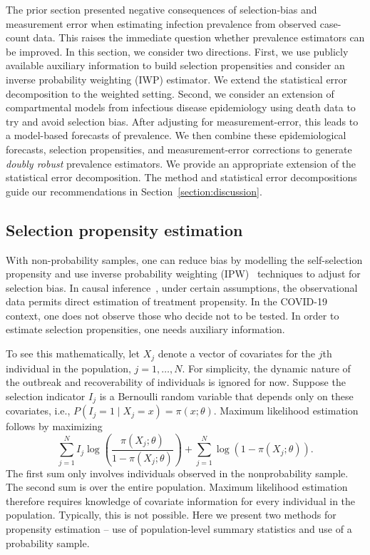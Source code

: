 \documentclass[11pt]{amsart}
\begin{document}
The prior section presented negative consequences of selection-bias and measurement error when estimating infection prevalence from observed case-count data.  This raises the immediate question whether prevalence estimators can be improved.  In this section, we consider two directions. First, we use publicly available auxiliary information to build selection propensities and consider an inverse probability weighting (IWP) estimator. We extend the statistical error decomposition to the weighted setting. Second, we consider an extension of compartmental models from infectious disease epidemiology using death data to try and avoid selection bias.  After adjusting for measurement-error, this leads to a model-based forecasts of prevalence. We then combine these epidemiological forecasts, selection propensities, and measurement-error corrections to generate \emph{doubly robust} prevalence estimators. We provide an appropriate extension of the statistical error decomposition. The method and statistical error decompositions guide our recommendations in Section~\ref{section:discussion}.

\subsection{Selection propensity estimation}

With non-probability samples, one can reduce bias by modelling the self-selection propensity and use inverse probability weighting (IPW)~\citep{Elliott2017} techniques to adjust for selection bias.  In causal inference~\citep{Hernan2020}, under certain assumptions, the observational data permits direct estimation of treatment propensity.  In the COVID-19 context, one does not observe those who decide not to be tested.  In order to estimate selection propensities, one needs auxiliary information.

To see this mathematically, let $X_j$ denote a vector of covariates for the $j$th individual in the population, $j=1,\ldots,N$.  For simplicity, the dynamic nature of the outbreak and recoverability of individuals is ignored for now. Suppose the selection indicator $I_j$ is a Bernoulli random variable that depends only on these covariates, i.e., $P(I_j = 1 \mid X_j = x) = \pi (x; \theta)$.  Maximum likelihood estimation follows by maximizing
\begin{equation}
\label{eq:propensity}
\sum_{j=1}^N I_j \log \left( \frac{\pi (X_j; \theta)}{1-\pi(X_j; \theta)} \right) + \sum_{j=1}^N \log \left( 1 - \pi (X_j; \theta) \right).
\end{equation}
The first sum only involves individuals observed in the nonprobability sample.
The second sum is over the entire population.  Maximum likelihood estimation therefore requires knowledge of covariate information for every individual in the population.  Typically, this is not possible.  Here we present two methods for propensity estimation -- use of population-level summary statistics and use of a probability sample.
\end{document}
